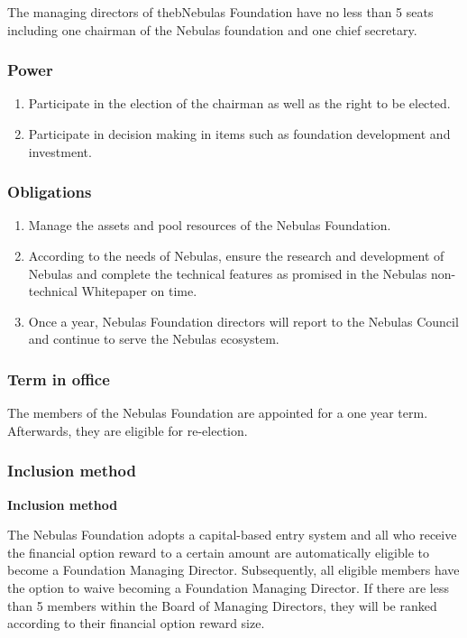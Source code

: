 The managing directors of thebNebulas Foundation have no less than 5 seats including one chairman of the Nebulas foundation and one chief secretary.

\subsubsection{Power}

\begin{enumerate}
	\item Participate in the election of the chairman as well as the right to be elected.
	\item Participate in decision making in items such as foundation development and investment.
\end{enumerate}

\subsubsection{Obligations}

\begin{enumerate}
	\item Manage the assets and pool resources of the Nebulas Foundation.
	\item According to the needs of Nebulas, ensure the research and development of Nebulas and complete the technical features as promised in the Nebulas non-technical Whitepaper on time.
	\item Once a year, Nebulas Foundation directors will report to the Nebulas Council and continue to serve the Nebulas ecosystem.
\end{enumerate}

\subsubsection{Term in office}

The members of the Nebulas Foundation are appointed for a one year term. Afterwards, they are eligible for re-election.

\subsubsection{Inclusion method}

\textbf{Inclusion method}

The Nebulas Foundation adopts a capital-based entry system and all who receive the financial option reward to a certain amount are automatically eligible to become a Foundation Managing Director. Subsequently, all eligible members have the option to waive becoming a Foundation Managing Director. If there are less than 5 members within the Board of Managing Directors, they will be ranked according to their financial option reward size.

